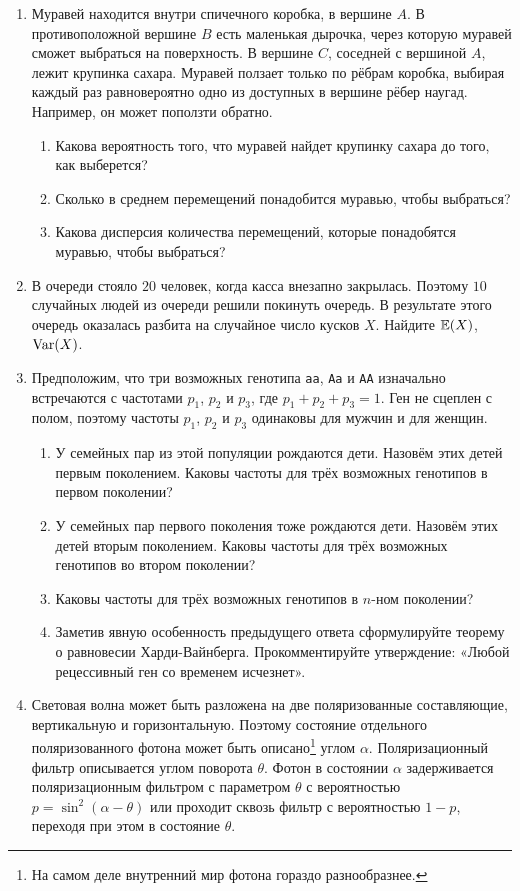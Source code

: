 \documentclass[12pt, a4paper]{article}\usepackage[]{graphicx}\usepackage[]{color}
\begin{document}
\begin{enumerate}

\item Муравей находится внутри спичечного коробка, в вершине $A$. В противоположной вершине $B$ есть маленькая дырочка, через которую муравей сможет выбраться на поверхность. В вершине $C$, соседней с вершиной $A$, лежит крупинка сахара. Муравей ползает только по рёбрам коробка, выбирая каждый раз равновероятно одно из доступных в вершине рёбер наугад. Например, он может поползти обратно.
\begin{enumerate}
\item Какова вероятность того, что муравей найдет крупинку сахара до того, как выберется?
\item Сколько в среднем перемещений понадобится муравью, чтобы выбраться?
\item Какова дисперсия количества перемещений, которые понадобятся муравью, чтобы выбраться?
\end{enumerate}

\item В очереди стояло $20$ человек, когда касса внезапно закрылась. Поэтому $10$ случайных людей из очереди решили покинуть очередь. В результате этого очередь оказалась разбита на случайное число кусков $X$. Найдите $\mathbb{E}(X)$, $\operatorname{Var}(X)$.

\item Предположим, что три возможных генотипа \verb|aa|, \verb|Aa| и \verb|AA| изначально встречаются с частотами $p_1$, $p_2$ и $p_3$, где $p_1+p_2+p_3=1$. Ген не сцеплен с полом, поэтому частоты $p_1$, $p_2$ и $p_3$ одинаковы для мужчин и для женщин.
\begin{enumerate}
\item У семейных пар из этой популяции рождаются дети. Назовём этих детей первым поколением. Каковы частоты для трёх возможных генотипов в первом поколении?
\item У семейных пар первого поколения тоже рождаются дети. Назовём этих детей вторым поколением. Каковы частоты для трёх возможных генотипов во втором поколении?
\item Каковы частоты для трёх возможных генотипов в $n$-ном поколении?
\item Заметив явную особенность предыдущего ответа сформулируйте теорему о равновесии Харди-Вайнберга. Прокомментируйте утверждение: «Любой рецессивный ген со временем исчезнет».
\end{enumerate}

\item Световая волна может быть разложена на две поляризованные составляющие, вертикальную и горизонтальную. Поэтому состояние отдельного поляризованного фотона может быть описано\footnote{На самом деле внутренний мир фотона гораздо разнообразнее.} углом $\alpha$. Поляризационный фильтр описывается углом поворота $\theta$. Фотон в состоянии $\alpha$ задерживается поляризационным фильтром с параметром $\theta$ с вероятностью $p=\sin^2(\alpha-\theta)$ или проходит сквозь фильтр с вероятностью $1-p$, переходя при этом в состояние $\theta$.


\end{enumerate}
\end{document}
